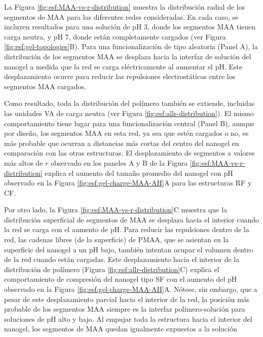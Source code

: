 La Figura \ref{fig:esf:MAA-vs-r-distribution} muestra la distribuci\'on radial de los segmentos de MAA para las diferentes redes consideradas. En cada caso, se incluyen resultados para una soluci\'on de pH 3, donde los segmentos MAA tienen carga neutra, y pH 7, donde est\'an completamente cargados (ver Figura \ref{fig:esf:gel-topologies}B). Para una funcionalizaci\'on de tipo aleatoria (Panel A), la distribuci\'on de los segmentos MAA se desplaza hacia la interfaz de soluci\'on del nanogel a medida que la red se carga el\'ectricamente al aumentar el pH. Este desplazamiento ocurre para reducir las repulsiones electrost\'aticas entre los segmentos MAA cargados.

Como resultado, toda la distribuci\'on del pol\'imero tambi\'en se extiende, incluidas las unidades VA de carga neutra (ver Figura \ref{fig:esf:allr-distribution}). El mismo comportamiento tiene lugar para una funcionalizaci\'on central (Panel B), aunque por dise\~no, los segmentos MAA en esta red, ya sea que est\'en cargados o no, es m\'as probable que ocurran a distancias m\'as cortas del centro del nanogel en comparaci\'on con las otras estructuras. El desplazamiento de segmentos a valores m\'as altos de $r$ observado en los paneles A y B de la Figura \ref{fig:esf:MAA-vs-r-distribution} explica el aumento del tama\~no promedio del nanogel con pH observado en la Figura \ref{fig:esf:gel-charge-MAA-AH}A para las estructuras RF y CF.

Por otro lado, la Figura \ref{fig:esf:MAA-vs-r-distribution}C muestra que la distribuci\'on superficial de segmentos de MAA se desplaza hacia el interior cuando la red se carga con el aumento de pH. Para reducir las repulsiones dentro de la red, las cadenas libres (de la superficie) de PMAA, que se asientan en la superficie del nanogel a un pH bajo, tambi\'en intentan ocupar el volumen dentro de la red cuando est\'an cargadas. Este desplazamiento hacia el interior de la distribuci\'on de pol\'imero (Figura \ref{fig:esf:allr-distribution}C) explica el comportamiento de compresi\'on del nanogel tipo SF con el aumento del pH observado en la Figura \ref{fig:esf:gel-charge-MAA-AH}A. N\'otese, sin embargo, que a pesar de este desplazamiento parcial hacia el interior de la red, la posici\'on m\'as probable de los segmentos MAA siempre es la interfaz pol\'imero-soluci\'on para soluciones de pH alto y bajo. Al empujar toda la estructura hacia el interior del nanogel, los segmentos de MAA quedan igualmente expuestos a la soluci\'on



